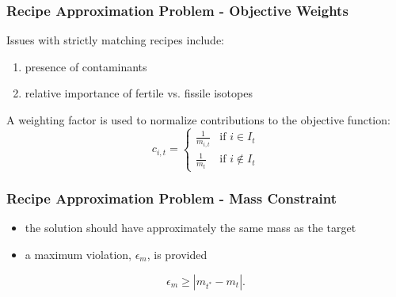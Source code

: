 \begin{frame}[ctb!]
  \frametitle{Recipe Approximation Problem - Objective Weights}

  Issues with strictly matching recipes include:
  \begin{enumerate}
    \item presence of contaminants
    \item relative importance of fertile vs. fissile isotopes
  \end{enumerate}

  A weighting factor is used to normalize contributions to the objective
  function:
  \begin{equation}\label{eqs:weights}
    c_{i,t} = 
    \begin{cases}
      \frac{1}{m_{i,t}} & \text{if } i \in I_{t} \\
      \frac{1}{m_{t}}   & \text{if } i \not\in I_{t}
    \end{cases}
  \end{equation}  
\end{frame}

\begin{frame}[ctb!]
  \frametitle{Recipe Approximation Problem - Mass Constraint}

  \begin{itemize}
    \item the solution should have approximately the same mass as the target
    \item a maximum violation, $\epsilon_{m}$, is provided
  \end{itemize}
  
  \begin{equation}\label{eqs:mass-constraint-simple}
    \epsilon_{m} \geq \left| m_{t^*} - m_{t} \right|.
  \end{equation}
\end{frame}

